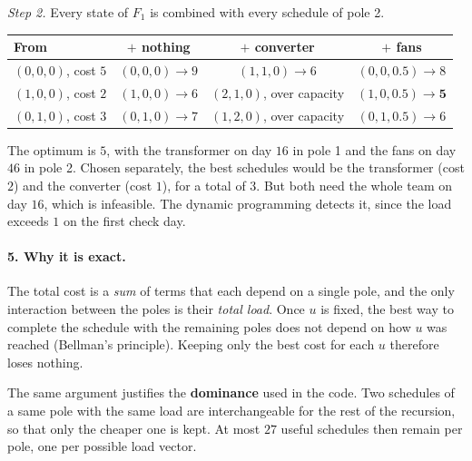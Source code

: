 \documentclass[11pt]{article}
\begin{document}
\emph{Step 2.} Every state of $F_1$ is combined with every schedule of pole 2.
\begin{center}
\begin{tabular}{lccc}
  \toprule
  From & $+$ nothing & $+$ converter & $+$ fans \\
  \midrule
  $(0,0,0)$, cost $5$ & $(0,0,0) \to 9$ & $(1,1,0) \to 6$ & $(0,0,0.5) \to 8$ \\
  $(1,0,0)$, cost $2$ & $(1,0,0) \to 6$ & $(2,1,0)$, over capacity & $(1,0,0.5) \to \mathbf{5}$ \\
  $(0,1,0)$, cost $3$ & $(0,1,0) \to 7$ & $(1,2,0)$, over capacity & $(0,1,0.5) \to 6$ \\
  \bottomrule
\end{tabular}
\end{center}
The optimum is $5$, with the transformer on day $16$ in pole 1 and the fans on day $46$ in pole 2.
Chosen separately, the best schedules would be the transformer (cost $2$) and the converter (cost
$1$), for a total of $3$. But both need the whole team on day $16$, which is infeasible. The dynamic
programming detects it, since the load exceeds $1$ on the first check day.

\paragraph{5. Why it is exact.} The total cost is a \emph{sum} of terms that each depend on a single
pole, and the only interaction between the poles is their \emph{total load}. Once $u$ is fixed, the
best way to complete the schedule with the remaining poles does not depend on how $u$ was reached
(Bellman's principle). Keeping only the best cost for each $u$ therefore loses nothing.

The same argument justifies the \textbf{dominance} used in the code. Two schedules of a same pole
with the same load are interchangeable for the rest of the recursion, so that only the cheaper one is
kept. At most $27$ useful schedules then remain per pole, one per possible load vector.
\end{document}
